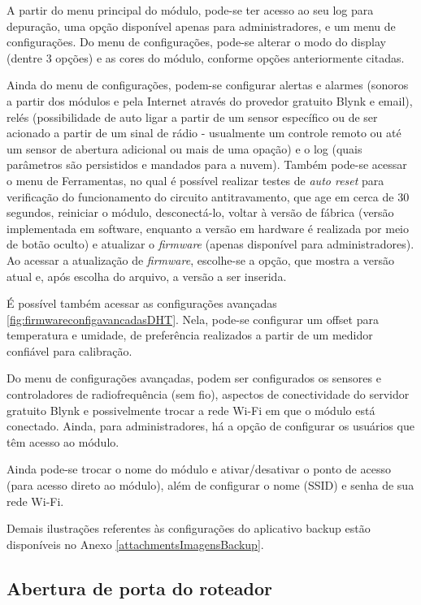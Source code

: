 A partir do menu principal do módulo, pode-se ter acesso ao seu log para depuração, uma opção disponível apenas para administradores, e um menu de configurações. Do menu de configurações, pode-se alterar o modo do display (dentre 3 opções) e as cores do módulo, conforme opções anteriormente citadas.

Ainda do menu de configurações, podem-se configurar alertas e alarmes (sonoros a partir dos módulos e pela Internet através do provedor gratuito Blynk e email), relés (possibilidade de auto ligar a partir de um sensor específico ou de ser acionado a partir de um sinal de rádio - usualmente um controle remoto ou até um sensor de abertura adicional ou mais de uma opação) e o log (quais parâmetros são persistidos e mandados para a nuvem). Também pode-se acessar o menu de Ferramentas, no qual é possível realizar testes de \emph{auto reset} para verificação do funcionamento do circuito antitravamento, que age em cerca de 30 segundos, reiniciar o módulo, desconectá-lo, voltar à versão de fábrica (versão implementada em software, enquanto a versão em hardware é realizada por meio de botão oculto) e atualizar o \emph{firmware} (apenas disponível para administradores).
Ao acessar a atualização de \emph{firmware}, escolhe-se a opção, que mostra a versão atual e, após escolha do arquivo, a versão a ser inserida. %

É possível também acessar as configurações avançadas \ref{fig:firmwareconfigavancadasDHT}. Nela, pode-se configurar um offset para temperatura e umidade, de preferência realizados a partir de um medidor confiável para calibração.

Do menu de configurações avançadas, podem ser configurados os sensores e controladores de radiofrequência (sem fio), aspectos de conectividade do servidor gratuito Blynk e possivelmente trocar a rede Wi-Fi em que o módulo está conectado. Ainda, para administradores, há a opção de configurar os usuários que têm acesso ao módulo.

Ainda pode-se trocar o nome do módulo e ativar/desativar o ponto de acesso (para acesso direto ao módulo), além de configurar o nome (SSID) e senha de sua rede Wi-Fi.

Demais ilustrações referentes às configurações do aplicativo backup estão disponíveis no Anexo \ref{attachmentsImagensBackup}{}.

\subsection{Abertura de porta do roteador}

